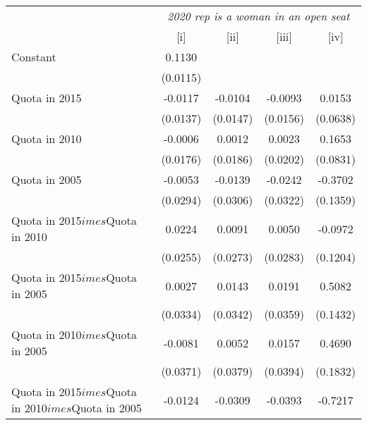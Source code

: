
\begingroup
\centering
\begin{tabular}{lcccc}
   \toprule
    & \multicolumn{4}{c}{\textit{2020 rep is a woman in an open seat}}\\
                                                           & [i]      & [ii]          & [iii]         & [iv]\\  
   \midrule 
   Constant                                                & 0.1130   &               &               &   \\   
                                                           & (0.0115) &               &               &   \\   
   Quota in 2015                                           & -0.0117  & -0.0104       & -0.0093       & 0.0153\\   
                                                           & (0.0137) & (0.0147)      & (0.0156)      & (0.0638)\\   
   Quota in 2010                                           & -0.0006  & 0.0012        & 0.0023        & 0.1653\\   
                                                           & (0.0176) & (0.0186)      & (0.0202)      & (0.0831)\\   
   Quota in 2005                                           & -0.0053  & -0.0139       & -0.0242       & -0.3702\\   
                                                           & (0.0294) & (0.0306)      & (0.0322)      & (0.1359)\\   
   Quota in 2015$	imes$Quota in 2010                      & 0.0224   & 0.0091        & 0.0050        & -0.0972\\   
                                                           & (0.0255) & (0.0273)      & (0.0283)      & (0.1204)\\   
   Quota in 2015$	imes$Quota in 2005                      & 0.0027   & 0.0143        & 0.0191        & 0.5082\\   
                                                           & (0.0334) & (0.0342)      & (0.0359)      & (0.1432)\\   
   Quota in 2010$	imes$Quota in 2005                      & -0.0081  & 0.0052        & 0.0157        & 0.4690\\   
                                                           & (0.0371) & (0.0379)      & (0.0394)      & (0.1832)\\   
   Quota in 2015$	imes$Quota in 2010$	imes$Quota in 2005 & -0.0124  & -0.0309       & -0.0393       & -0.7217\\   

\end{tabular}
